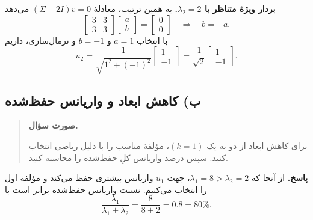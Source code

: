 \documentclass{article}
\numberwithin{equation}{section}
\numberwithin{table}{section}
\newenvironment{questionprompt}{%
    \begin{quote}\noindent\textbf{صورت سؤال.}\enspace\ignorespaces
}{%
    \end{quote}\noindent\textbf{پاسخ.}\enspace\ignorespacesafterend
}
\begin{document}
\noindent\textbf{بردار ویژهٔ متناظر با \(\lambda_2=2\).}
به همین ترتیب، معادلهٔ \((\Sigma-2I)v=0\) می‌دهد
\[
    \begin{bmatrix}3&3\\3&3\end{bmatrix}
    \begin{bmatrix}a\\b\end{bmatrix}
    =\begin{bmatrix}0\\0\end{bmatrix}
    \quad\Longrightarrow\quad b=-a.
\]
با انتخاب \(a=1\) و \(b=-1\) و نرمال‌سازی، داریم
\[
    u_2=\frac{1}{\sqrt{1^2+(-1)^2}}\begin{bmatrix}1\\-1\end{bmatrix}
       =\frac{1}{\sqrt{2}}\begin{bmatrix}1\\-1\end{bmatrix}.
\]

\subsection*{ب) کاهش ابعاد و واریانس حفظ‌شده}
\begin{questionprompt}
    برای کاهش ابعاد از دو به یک \((k=1)\)، مؤلفهٔ مناسب را با دلیل ریاضی انتخاب کنید. سپس درصد واریانس کلِ حفظ‌شده را محاسبه کنید.
\end{questionprompt}
از آنجا که \(\lambda_1=8>\lambda_2=2\)، جهت \(u_1\) واریانس بیشتری حفظ می‌کند و مؤلفهٔ اول را انتخاب می‌کنیم. نسبت واریانس حفظ‌شده برابر است با
\[
    \frac{\lambda_1}{\lambda_1+\lambda_2}
    =\frac{8}{8+2}=0.8=80\%.
\]
\end{document}
